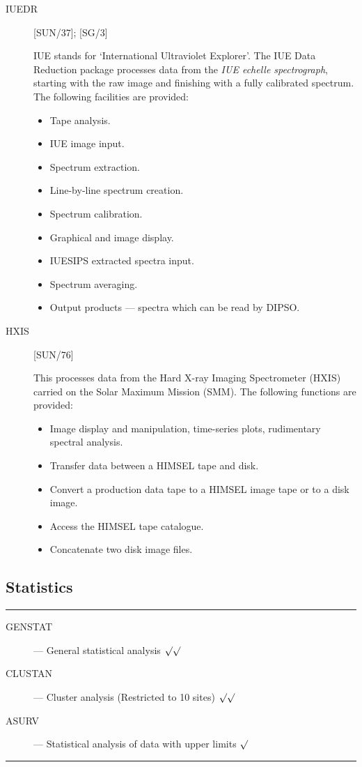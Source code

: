 \begin{description}

\item [IUEDR] \hfill [SUN/37]; [SG/3]

IUE stands for `International Ultraviolet Explorer'.
The IUE Data Reduction package processes data from the {\em IUE echelle
spectrograph}, starting with the raw image and finishing with a fully calibrated
spectrum.
The following facilities are provided:
\begin{itemize}
\item Tape analysis.
\item IUE image input.
\item Spectrum extraction.
\item Line-by-line spectrum creation.
\item Spectrum calibration.
\item Graphical and image display.
\item IUESIPS extracted spectra input.
\item Spectrum averaging.
\item Output products --- spectra which can be read by DIPSO.
\end{itemize}

\item [HXIS] \hfill [SUN/76]

This processes data from the Hard X-ray Imaging Spectrometer (HXIS) carried on
the Solar Maximum Mission (SMM).
The following functions are provided:
\begin{itemize}
\item Image display and manipulation, time-series plots, rudimentary spectral
 analysis.
\item Transfer data between a HIMSEL tape and disk.
\item Convert a production data tape to a HIMSEL image tape or to a disk image.
\item Access the HIMSEL tape catalogue.
\item Concatenate two disk image files.
\end{itemize}

\end{description}

\newpage

\subsection{Statistics}

\rule{\textwidth}{0.5mm}
\begin{description}
\begin{description}
\item [GENSTAT] --- General statistical analysis \hfill $\surd\surd$
\item [CLUSTAN] --- Cluster analysis (Restricted to 10 sites) \hfill
 $\surd\surd$
\item [ASURV] --- Statistical analysis of data with upper limits \hfill $\surd$
\end{description}
\end{description}
\rule{\textwidth}{0.5mm}

